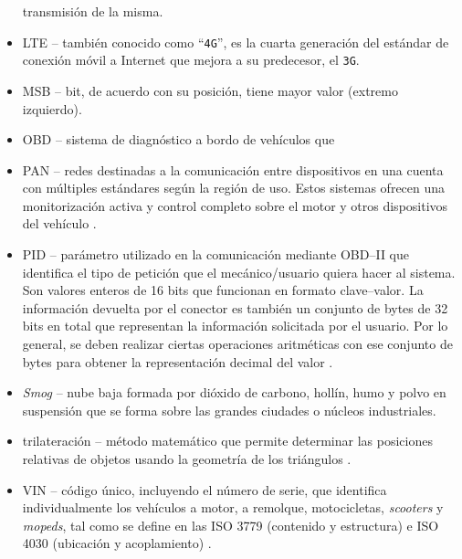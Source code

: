 \begin{itemize}
        transmisión de la misma.
  \item \ac{LTE} -- también conocido como ``\texttt{4G}'', es la cuarta generación
        del estándar de conexión móvil a Internet que mejora a su predecesor, el \texttt{3G}.
  \item \ac{MSB} -- bit, de acuerdo con su posición, tiene mayor valor (extremo izquierdo).
  \item \ac{OBD} -- sistema de diagnóstico a bordo de vehículos que
  \item \ac{PAN} -- redes destinadas a la comunicación entre dispositivos en una
        cuenta con múltiples estándares según la región de uso. Estos
        sistemas ofrecen una monitorización activa y control completo
        sobre el motor y otros dispositivos del vehículo \cite{OBD2021}.
  \item \ac{PID} -- parámetro utilizado en la comunicación mediante \ac{OBD}--II que
        identifica el tipo de petición que el mecánico/usuario quiera hacer al sistema.
        Son valores enteros de 16 bits que funcionan en formato clave--valor. La información
        devuelta por el conector es también un conjunto de bytes de 32 bits en total que
        representan la información solicitada por el usuario. Por lo general, se deben
        realizar ciertas operaciones aritméticas con ese conjunto de bytes para obtener
        la representación decimal del valor \cite{OBDIIPIDs2021}.
  \item \textit{Smog} -- nube baja formada por dióxido de carbono, hollín, humo y polvo
        en suspensión que se forma sobre las grandes ciudades o núcleos industriales.
  \item trilateración -- método matemático que permite determinar las posiciones
        relativas de objetos usando la geometría de los triángulos \cite{Trilateracion2021}.
  \item \ac{VIN} -- código único, incluyendo el número de serie, que identifica individualmente
        los vehículos a motor, a remolque, motocicletas, \textit{scooters} y \textit{mopeds},
        tal como se define en las ISO 3779 (contenido y estructura) e ISO 4030 (ubicación
        y acoplamiento) \cite{VehicleIdentificationNumber2022}.
\end{itemize}
